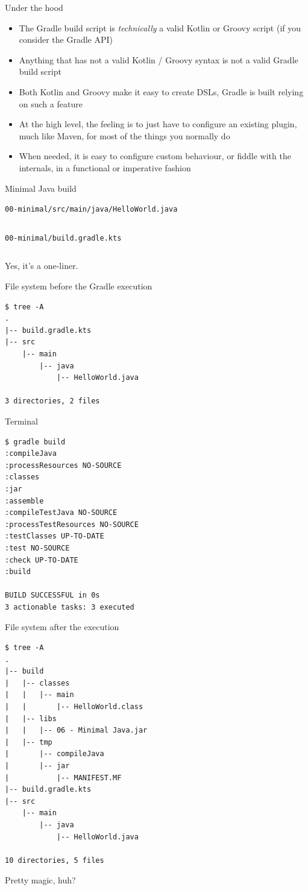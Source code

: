 \documentclass[presentation]{beamer}
\newcommand{\codefile}[3]{
	\begin{block}{\texttt{#1}}
		\inputminted[fontsize=#2,linenos=true,breaklines=true]{#3}{workspace/#1}
	\end{block}
}
\newcommand{\java}[2]{\codefile{#1}{#2}{java}}
\newcommand{\groovy}[2]{\codefile{#1}{#2}{groovy}}
\begin{document}
\begin{frame}[fragile]{Under the hood}
	\begin{itemize}
		\item The Gradle build script is \textit{technically} a valid Kotlin or Groovy script (if you consider the Gradle API)
		\item Anything that has not a valid Kotlin / Groovy syntax is not a valid Gradle build script
		\item Both Kotlin and Groovy make it easy to create DSLs, Gradle is built relying on such a feature
		\item At the high level, the feeling is to just have to configure an existing plugin, much like Maven, for most of the things you normally do
		\item When needed, it is easy to configure custom behaviour, or fiddle with the internals, in a functional or imperative fashion
	\end{itemize}
\end{frame}

\begin{frame}{Minimal Java build}
	\java{00-minimal/src/main/java/HelloWorld.java}{\scriptsize}
	\groovy{00-minimal/build.gradle.kts}{\scriptsize}
	Yes, it's a one-liner.
	\begin{block}{File system before the Gradle execution}
		\begin{verbatim}
$ tree -A
.
|-- build.gradle.kts
|-- src
    |-- main
        |-- java
            |-- HelloWorld.java

3 directories, 2 files
		\end{verbatim}
	\end{block}
	\begin{block}{Terminal}
		\begin{verbatim}
$ gradle build
:compileJava
:processResources NO-SOURCE
:classes
:jar
:assemble
:compileTestJava NO-SOURCE
:processTestResources NO-SOURCE
:testClasses UP-TO-DATE
:test NO-SOURCE
:check UP-TO-DATE
:build

BUILD SUCCESSFUL in 0s
3 actionable tasks: 3 executed
		\end{verbatim}
	\end{block}
	\begin{block}{File system after the execution}
		\begin{verbatim}
$ tree -A
.
|-- build
|   |-- classes
|   |   |-- main
|   |       |-- HelloWorld.class
|   |-- libs
|   |   |-- 06 - Minimal Java.jar
|   |-- tmp
|       |-- compileJava
|       |-- jar
|           |-- MANIFEST.MF
|-- build.gradle.kts
|-- src
    |-- main
        |-- java
            |-- HelloWorld.java

10 directories, 5 files
		\end{verbatim}
	\end{block}
	\begin{center}
		Pretty magic, huh?
	\end{center}
\end{frame}
\end{document}

